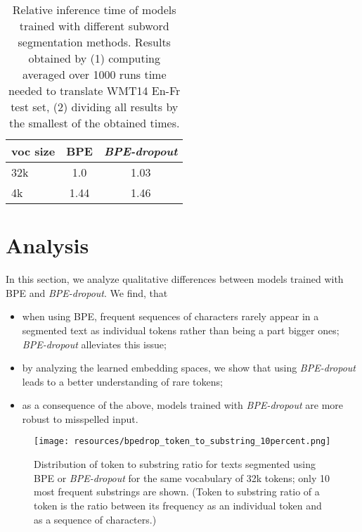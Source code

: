 \documentclass[11pt,a4paper]{article}
\begin{document}
\begin{table}[t!]
\centering
\begin{tabular}{l|cc}
\toprule
voc size & BPE & \textit{BPE-dropout}\\
\midrule
32k & 1.0 & 1.03 \\
4k & 1.44 & 1.46 \\

\bottomrule
\end{tabular}
\caption{Relative inference time of models trained with different subword segmentation methods. Results obtained by (1) computing averaged over 1000 runs time needed to translate WMT14 En-Fr test set, (2) dividing all results by the smallest of the obtained times. }
\label{tab:timing}
\end{table}




 
\section{Analysis}
\label{sect:analysis}








In this section, we analyze qualitative differences between models trained with BPE and \textit{BPE-dropout}. We find, that 
\begin{itemize}
    \item when using BPE, frequent sequences of characters rarely appear in a segmented text as individual tokens rather than being a part bigger ones; \textit{BPE-dropout} alleviates this issue;
    \item by analyzing the learned embedding spaces, we show that using \textit{BPE-dropout} leads to a better understanding of rare tokens;
    \item as a consequence of the above, models trained with \textit{BPE-dropout} are more robust to misspelled input.
\end{itemize}


\begin{figure}[t!]
    \centering
    
    \texttt{[image: resources/bpedrop\_token\_to\_substring\_10percent.png]}
    
    
    \caption{Distribution of token to substring ratio for texts segmented using BPE or \textit{BPE-dropout} for the same vocabulary of 32k tokens; only 10 most frequent substrings are shown.  (Token to substring ratio of a token is the ratio between its frequency as an individual token and as a sequence of characters.)  }\label{fig:token_frequency}
\end{figure}
\end{document}
